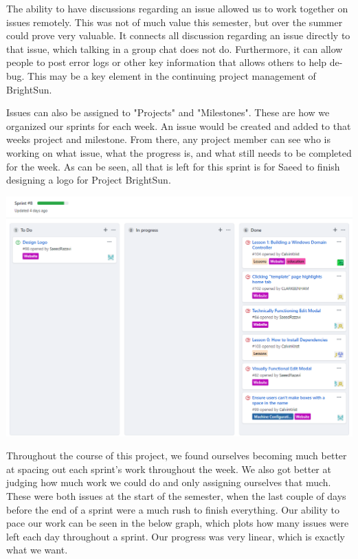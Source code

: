 \documentclass[openright]{report}
\begin{document}
\par The ability to have discussions regarding an issue allowed us to work together on issues remotely. This was not of much value this semester, but over the summer could prove very valuable. It connects all discussion regarding an issue directly to that issue, which talking in a group chat does not do. Furthermore, it can allow people to post error logs or other key information that allows others to help de-bug. This may be a key element in the continuing project management of BrightSun.

\par Issues can also be assigned to "Projects" and "Milestones". These are how we organized our sprints for each week. An issue would be created and added to that weeks project and milestone. From there, any project member can see who is working on what issue, what the progress is, and what still needs to be completed for the week. As can be seen, all that is left for this sprint is for Saeed to finish designing a logo for Project BrightSun. 

\begin{center}
    \includegraphics[scale=0.60]{images/project.png}
\end{center}

\par Throughout the course of this project, we found ourselves becoming much better at spacing out each sprint's work throughout the week. We also got better at judging how much work we could do and only assigning ourselves that much. These were both issues at the start of the semester, when the last couple of days before the end of a sprint were a much rush to finish everything. Our ability to pace our work can be seen in the below graph, which plots how many issues were left each day throughout a sprint. Our progress was very linear, which is exactly what we want.
\end{document}
